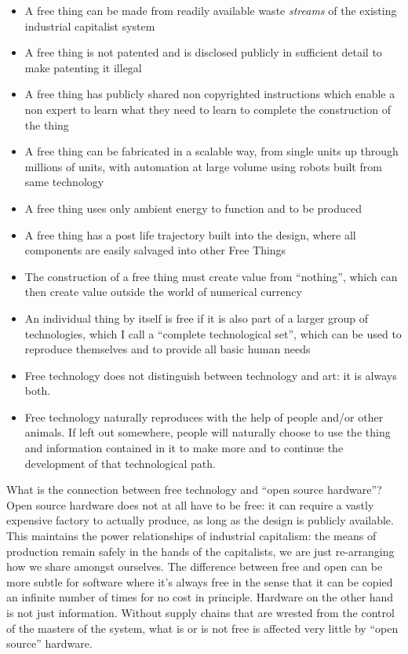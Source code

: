 \begin{itemize}
\item
  A free thing can be made from readily available waste \emph{streams}
  of the existing industrial capitalist system
\item
  A free thing is not patented and is disclosed publicly in sufficient
  detail to make patenting it illegal
\item
  A free thing has publicly shared non copyrighted instructions which
  enable a non expert to learn what they need to learn to complete the
  construction of the thing
\item
  A free thing can be fabricated in a scalable way, from single units up
  through millions of units, with automation at large volume using
  robots built from same technology
\item
  A free thing uses only ambient energy to function and to be produced
\item
  A free thing has a post life trajectory built into the design, where
  all components are easily salvaged into other Free Things
\item
  The construction of a free thing must create value from ``nothing'',
  which can then create value outside the world of numerical currency
\item
  An individual thing by itself is free if it is also part of a larger
  group of technologies, which I call a ``complete technological set'',
  which can be used to reproduce themselves and to provide all basic
  human needs
\item
  Free technology does not distinguish between technology and art: it is
  always both.
\item
  Free technology naturally reproduces with the help of people and/or
  other animals. If left out somewhere, people will naturally choose to
  use the thing and information contained in it to make more and to
  continue the development of that technological path.
\end{itemize}

What is the connection between free technology and ``open source
hardware''? Open source hardware does not at all have to be free: it can
require a vastly expensive factory to actually produce, as long as the
design is publicly available. This maintains the power relationships of
industrial capitalism: the means of production remain safely in the
hands of the capitalists, we are just re-arranging how we share amongst
ourselves. The difference between free and open can be more subtle for
software where it's always free in the sense that it can be copied an
infinite number of times for no cost in principle. Hardware on the other
hand is not just information. Without supply chains that are wrested
from the control of the masters of the system, what is or is not free is
affected very little by ``open source'' hardware.

